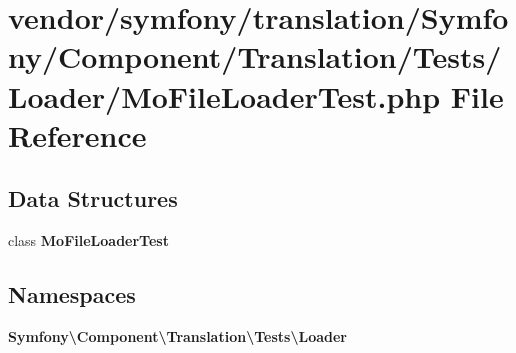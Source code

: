 \section{vendor/symfony/translation/\+Symfony/\+Component/\+Translation/\+Tests/\+Loader/\+Mo\+File\+Loader\+Test.php File Reference}
\label{_mo_file_loader_test_8php}
\subsection*{Data Structures}
\begin{DoxyCompactItemize}
\item 
class {\bf Mo\+File\+Loader\+Test}
\end{DoxyCompactItemize}
\subsection*{Namespaces}
\begin{DoxyCompactItemize}
\item 
 {\bf Symfony\textbackslash{}\+Component\textbackslash{}\+Translation\textbackslash{}\+Tests\textbackslash{}\+Loader}
\end{DoxyCompactItemize}
